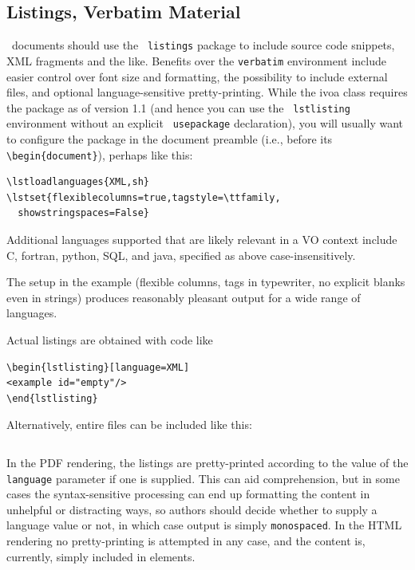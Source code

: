 \documentclass[11pt,a4paper]{ivoa}
\newcommand{\texword}[1]{\texttt{\color{texcolor} #1}}
\begin{document}
\subsection{Listings, Verbatim Material}
\label{sect:verbatim}

\ivoatex\ documents should use the \texword{listings} package to include
source code snippets, XML fragments and the like.
Benefits over the \verb|verbatim| environment include easier control over
font size and formatting, the possibility to include external files,
and optional language-sensitive pretty-printing.
While the ivoa class
requires the package as of version 1.1 (and hence you can use the
\texword{lstlisting} environment without an explicit
\texword{usepackage} declaration), you will usually want to configure
the package in the document preamble (i.e., before its
\verb|\begin{document}|), perhaps like this:

\begin{lstlisting}
\lstloadlanguages{XML,sh}
\lstset{flexiblecolumns=true,tagstyle=\ttfamily,
  showstringspaces=False}
\end{lstlisting}

Additional
languages supported that are likely relevant in a VO context include C,
fortran, python, SQL, and java, specified as above case-insensitively.

The setup in the example (flexible columns, tags in
typewriter, no explicit blanks even in strings)
produces reasonably pleasant output for a wide range of languages.

Actual listings are obtained with code like
\begin{verbatim}
\begin{lstlisting}[language=XML]
<example id="empty"/>
\end{lstlisting}
\end{verbatim}
Alternatively, entire files can be included like this:
\begin{verbatim}

\end{verbatim}
In the PDF rendering, the listings are pretty-printed
according to the value of the \verb|language| parameter if one is supplied.
This can aid comprehension, but in some cases the syntax-sensitive
processing can end up formatting the content in
unhelpful or distracting ways,
so authors should decide whether to supply a language value
or not, in which case output is simply \verb|monospaced|.
In the HTML rendering no pretty-printing is attempted in any case,
and the content is, currently, simply included in  elements.
\end{document}
